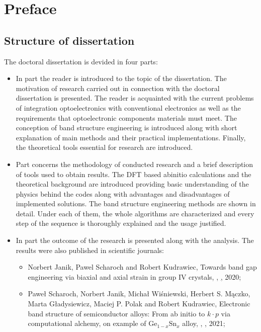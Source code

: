 \chapter*{Preface}



\section*{Structure of dissertation}

The doctoral dissertation is devided in four parts:
\begin{itemize}
	\item In part \hyperref[part:I]{} the reader is introduced to the topic of the dissertation.
	The motivation of research carried out in connection with the doctoral dissertation is presented.
	The reader is acquainted with the current problems of integration optoelectronics with conventional electronics as well as the requirements that optoelectronic components materials must meet.
	The conception of band structure engineering is introduced along with short explanation of main methods and their practical implementations.
	Finally, the theoretical tools essential for research are introduced.
	\item Part \hyperref[part:II]{} concerns the methodology of conducted research and a brief description of tools used to obtain results.
	The \acrshort{DFT} based \acrshort{abinitio} calculations and the theoretical background are introduced providing basic understanding of the physics behind the codes along with advantages and disadvantages of implemented solutions.
	The band structure engineering methods are shown in detail.
	Under each of them, the whole algorithms are characterized and every step of the sequence is thoroughly explained and the usage justified.
	\item In part \hyperref[part:III]{} the outcome of the research is presented along with the analysis. The results were also published in scientific journals:
	\begin{itemize}
		\item [\cite{janik.2020}] Norbert Janik, Pawel Scharoch and Robert Kudrawiec,  Towards band gap engineering via biaxial and axial strain in group IV crystals, \href{https://doi.org/10.1016/j.commatsci.2020.109729}{}, \href{https://www.sciencedirect.com/science/article/pii/S0927025620302202}, 2020;
		\item [\cite{janik.2021}] Paweł Scharoch, Norbert Janik, Michał Wiśniewski, Herbert S. Mączko, Marta Gładysiewicz, Maciej P. Polak and Robert Kudrawiec,  Electronic band structure of semiconductor alloys: From ab initio to $k\cdot p$ via computational alchemy, on example of $\textrm{Ge}_{1-x}\textrm{Sn}_x$ alloy, \href{https://doi.org/10.1016/j.commatsci.2020.110052}{}, \href{https://www.sciencedirect.com/science/article/pii/S0927025620305437}, 2021;

\end{itemize}
\end{itemize}
